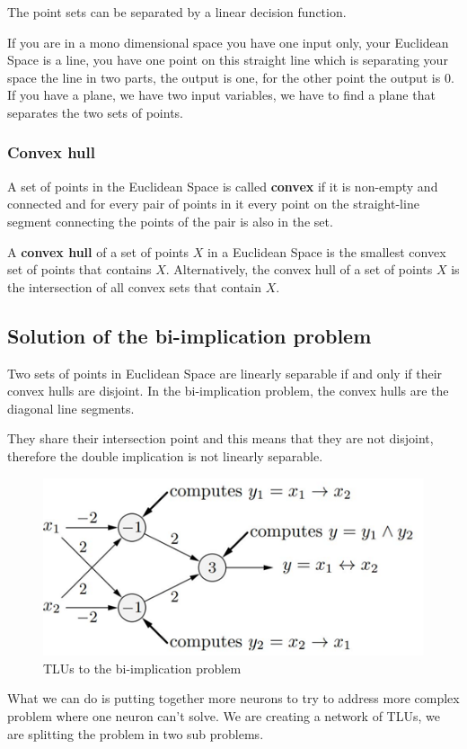 \documentclass{article}
\begin{document}
The point sets can be separated by a linear decision function.

If you are in a mono dimensional space you have one input only,
your Euclidean Space is a line, you have one point on this straight line which is separating
your space the line in two parts, the output is one, for the other point the output is $0$.
If you have a plane, we have two input variables, we have to find a plane that separates
the two sets of points.
\subsubsection{Convex hull}
A set of points in the Euclidean Space is called \textbf{convex} if it is non-empty and
connected and for every pair of points in it every point on the straight-line segment
connecting the points of the pair is also in the set.

A \textbf{convex hull} of a set of points $X$ in a Euclidean Space is the smallest convex set of
points that contains $X$. Alternatively, the convex hull of a set of points $X$ is the intersection
of all convex sets that contain $X$.
\subsection{Solution of the bi-implication problem}
Two sets of points in Euclidean Space are linearly separable if and only if their convex hulls
are disjoint. In the bi-implication problem, the convex hulls are the diagonal line segments.

They share their intersection point and this means that they are not disjoint, therefore
the double implication is not linearly separable.

\begin{figure}[H]
    \includegraphics[scale=0.8]{images/sol_bi_implic_problem.png}
    \centering
    \caption{TLUs to the bi-implication problem}
\end{figure}
What we can do is putting together more neurons to try to address more complex problem where
one neuron can’t solve. We are creating a network of TLUs, we are splitting the problem in two
sub problems.
\end{document}
